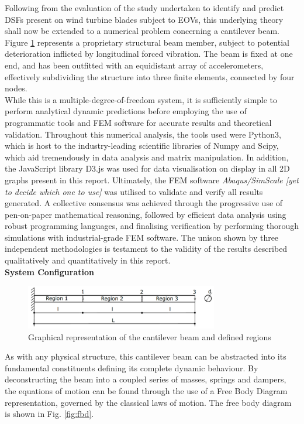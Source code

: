 \documentclass{article}
\begin{document}
Following from the evaluation of the study undertaken to identify and predict DSFs present on wind turbine blades subject to EOVs, this underlying theory shall now be extended to a numerical problem concerning a cantilever beam. Figure \ref{fig:beam} represents a proprietary structural beam member, subject to potential deterioration inflicted by longitudinal forced vibration. The beam is fixed at one end, and has been outfitted with an equidistant array of accelerometers, effectively subdividing the structure into three finite elements, connected by four nodes.\medskip\\
While this is a multiple-degree-of-freedom system, it is sufficiently simple to perform analytical dynamic predictions before employing the use of programmatic tools and FEM software for accurate results and theoretical validation. Throughout this numerical analysis, the tools used were Python3, which is host to the industry-leading scientific libraries of Numpy and Scipy, which aid tremendously in data analysis and matrix manipulation. In addition, the JavaScript library D3.js was used for data visualisation on display in all 2D graphs present in this report. Ultimately, the FEM software \textit{Abaqus/SimScale [yet to decide which one to use]} was utilised to validate and verify all results generated. A collective consensus was achieved through the progressive use of pen-on-paper mathematical reasoning, followed by efficient data analysis using robust programming languages, and finalising verification by performing thorough simulations with industrial-grade FEM software. The unison shown by three independent methodologies is testament to the validity of the results described qualitatively and quantitatively in this report.\medskip\\

\large\textbf{System Configuration}
\label{system_config}

\begin{figure}[h!]
    \centering
    \includegraphics[width=0.75\textwidth]{images/cantBeam.png}
    \caption{Graphical representation of the cantilever beam and defined regions}
    \label{fig:beam}
\end{figure}

As with any physical structure, this cantilever beam can be abstracted into its fundamental constituents defining its complete dynamic behaviour. By deconstructing the beam into a coupled series of masses, springs and dampers, the equations of motion can be found through the use of a Free Body Diagram representation, governed by the classical laws of motion. The free body diagram is shown in Fig. \ref{fig:fbd}.\medskip\\
\end{document}
